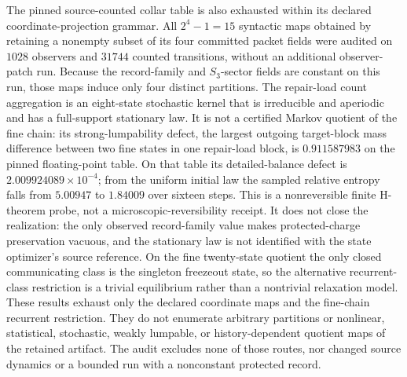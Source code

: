 \documentclass[11pt]{article}
\newcounter{none}
\begin{document}
The pinned source-counted collar table is also exhausted within its
declared coordinate-projection grammar. All \(2^4-1=15\) syntactic maps obtained
by retaining a nonempty subset of its four committed packet fields were audited
on \(1028\) observers and \(31744\) counted transitions, without an additional
observer-patch run. Because the record-family and \(S_3\)-sector fields are
constant on this run, those maps induce only four distinct partitions. The
repair-load count aggregation is an eight-state
stochastic kernel that is irreducible and aperiodic and has a full-support
stationary law. It is not a certified Markov quotient of the fine chain: its
strong-lumpability defect, the largest outgoing target-block mass difference
between two fine states in one repair-load block, is \(0.911587983\) on the
pinned floating-point table. On that table its detailed-balance
defect is \(2.009924089\times10^{-4}\); from the uniform initial law the sampled
relative entropy falls from \(5.00947\) to \(1.84009\) over sixteen steps. This
is a nonreversible finite H-theorem probe, not a microscopic-reversibility
receipt. It does not close the realization: the only observed record-family
value makes protected-charge preservation vacuous, and the stationary law is
not identified with the state optimizer's source reference. On the fine
twenty-state quotient the only closed communicating class is the singleton
freezeout state, so the alternative recurrent-class restriction is a trivial
equilibrium rather than a nontrivial relaxation model. These results exhaust
only the declared coordinate maps and the fine-chain recurrent restriction.
They do not enumerate arbitrary partitions or nonlinear, statistical,
stochastic, weakly lumpable, or history-dependent quotient maps of the retained
artifact. The audit excludes none of those routes, nor changed source dynamics
or a bounded run with a nonconstant protected record.
\end{document}
